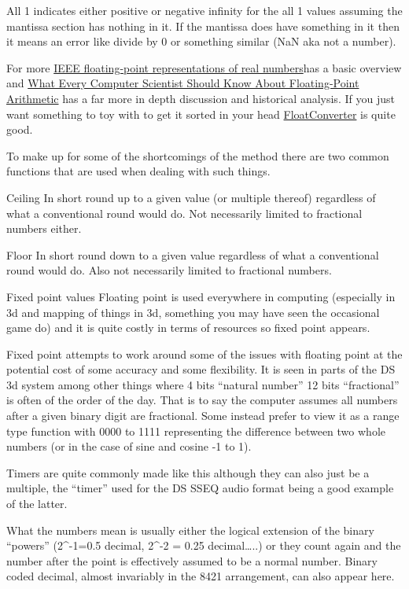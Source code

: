 \documentclass[
]{book}
\begin{document}
All 1 indicates either positive or negative infinity for the all 1 values assuming the mantissa section has nothing in it. If the mantissa does have something in it then it means an error like divide by 0 or something similar (NaN aka not a number).

For more \href{http://www.math.grin.edu/~rebelsky/Courses/152/97F/Readings/IEEE-reals.html}{IEEE floating-point representations of real numbers}has a basic overview and \href{http://docs.oracle.com/cd/E19957-01/806-3568/ncg_goldberg.html}{What Every Computer Scientist Should Know About Floating-Point Arithmetic} has a far more in depth discussion and historical analysis. If you just want something to toy with to get it sorted in your head \href{http://www.h-schmidt.net/FloatConverter/IEEE754.html}{FloatConverter} is quite good.

To make up for some of the shortcomings of the method there are two common functions that are used when dealing with such things.

Ceiling In short round up to a given value (or multiple thereof) regardless of what a conventional round would do. Not necessarily limited to fractional numbers either.

Floor In short round down to a given value regardless of what a conventional round would do. Also not necessarily limited to fractional numbers.

Fixed point values Floating point is used everywhere in computing (especially in 3d and mapping of things in 3d, something you may have seen the occasional game do) and it is quite costly in terms of resources so fixed point appears.

Fixed point attempts to work around some of the issues with floating point at the potential cost of some accuracy and some flexibility. It is seen in parts of the DS 3d system among other things where 4 bits ``natural number'' 12 bits ``fractional'' is often of the order of the day. That is to say the computer assumes all numbers after a given binary digit are fractional. Some instead prefer to view it as a range type function with 0000 to 1111 representing the difference between two whole numbers (or in the case of sine and cosine -1 to 1).

Timers are quite commonly made like this although they can also just be a multiple, the ``timer'' used for the DS SSEQ audio format being a good example of the latter.

What the numbers mean is usually either the logical extension of the binary ``powers'' (2\^{}-1=0.5 decimal, 2\^{}-2 = 0.25 decimal\ldots..) or they count again and the number after the point is effectively assumed to be a normal number. Binary coded decimal, almost invariably in the 8421 arrangement, can also appear here.
\end{document}
